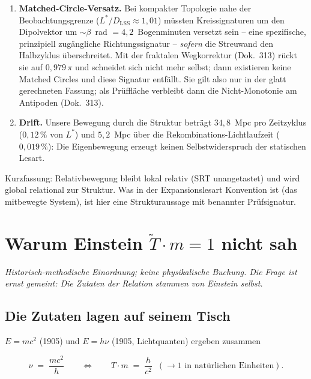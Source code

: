 \documentclass[11pt]{report}
\begin{document}
\begin{enumerate}
  \item \textbf{Matched-Circle-Versatz.} Bei kompakter Topologie
        nahe der Beobachtungsgrenze ($L^{*}/D_\text{LSS} \approx
        1{,}01$) müssten Kreissignaturen um den Dipolvektor um
        $\sim\beta$~rad $= 4{,}2$~Bogenminuten versetzt sein --
        eine spezifische, prinzipiell zugängliche
        Richtungssignatur -- \emph{sofern} die Streuwand den
        Halbzyklus überschreitet. Mit der fraktalen Wegkorrektur
        (Dok.~313) rückt sie auf $0{,}979\,\pi$ und schneidet
        sich nicht mehr selbst; dann existieren keine Matched
        Circles und diese Signatur entfällt. Sie gilt also nur in
        der glatt gerechneten Fassung; als Prüffläche verbleibt
        dann die Nicht-Monotonie am Antipoden (Dok.~313).
  \item \textbf{Drift.} Unsere Bewegung durch die Struktur beträgt
        $34{,}8$~Mpc pro Zeitzyklus ($0{,}12\,\%$ von $L^{*}$) und
        $5{,}2$~Mpc über die Rekombinations-Lichtlaufzeit
        ($0{,}019\,\%$): Die Eigenbewegung erzeugt keinen
        Selbstwiderspruch der statischen Lesart.
\end{enumerate}

Kurzfassung: Relativbewegung bleibt lokal relativ (SRT
unangetastet) und wird global relational zur Struktur. Was in der
Expansionslesart Konvention ist (das mitbewegte System), ist hier
eine Strukturaussage mit benannter Prüfsignatur.

\chapter{Warum Einstein $\tilde T \cdot m = 1$ nicht sah}

\emph{Historisch-methodische Einordnung; keine physikalische
Buchung. Die Frage ist ernst gemeint: Die Zutaten der Relation
stammen von Einstein selbst.}

\section{Die Zutaten lagen auf seinem Tisch}

$E = mc^2$ (1905) und $E = h\nu$ (1905, Lichtquanten) ergeben
zusammen

\begin{equation}
  \nu \;=\; \frac{mc^2}{h}
  \qquad\Longleftrightarrow\qquad
  T \cdot m \;=\; \frac{h}{c^2} \;\;(\to 1
  \text{ in natürlichen Einheiten}).
\end{equation}
\end{document}
